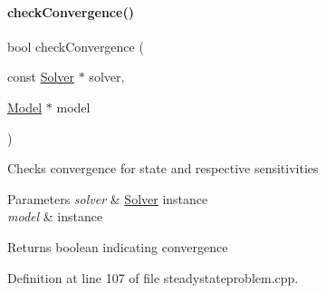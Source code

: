 \paragraph{\texorpdfstring{check\+Convergence()}{checkConvergence()}}
{\footnotesize\ttfamily bool check\+Convergence (\begin{DoxyParamCaption}\item[{const \mbox{\hyperlink{classamici_1_1_solver}{Solver}} $\ast$}]{solver,  }\item[{\mbox{\hyperlink{classamici_1_1_model}{Model}} $\ast$}]{model }\end{DoxyParamCaption})}

Checks convergence for state and respective sensitivities


\begin{DoxyParams}{Parameters}
{\em solver} & \mbox{\hyperlink{classamici_1_1_solver}{Solver}} instance \\
\hline
{\em model} & instance \\
\hline
\end{DoxyParams}
\begin{DoxyReturn}{Returns}
boolean indicating convergence 
\end{DoxyReturn}


Definition at line 107 of file steadystateproblem.\+cpp.


